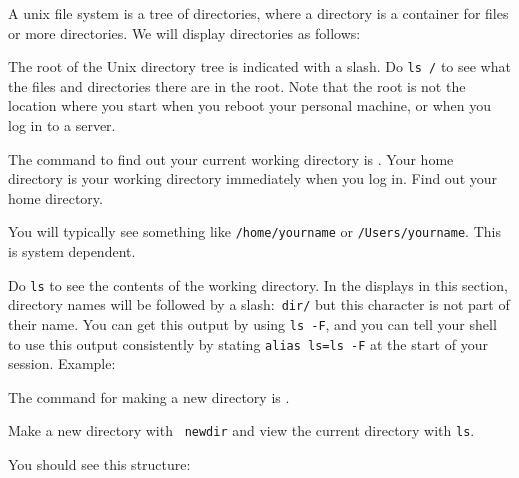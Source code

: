 A unix file system is a tree of directories, where a directory is a
container for files or more directories. We will display directories
as follows:

The root of the Unix directory tree is indicated with a slash. Do
\lstinline{ls /} to see what the files and directories there are in the
root. Note that the root is not the location where you start when you
reboot your personal machine, or when you log in to a server.

\begin{exercise}
  The command to find out your current working directory is
  . Your home directory is your working directory
  immediately when you log in. Find out your home directory.
\end{exercise}
\begin{outcome}
  You will typically see something like \lstinline{/home/yourname} or
  \lstinline{/Users/yourname}. This is system dependent.
\end{outcome}

Do \lstinline{ls} to see the contents of the working directory. In the
displays in this section, directory names will be followed by a
slash:~\lstinline{dir/} but this character is not part of their name.  You can
get this output by using \lstinline{ls -F}, and you can tell your shell to
use this output consistently by stating \lstinline{alias ls=ls -F} at the start of your
session. Example:


The command for making a new directory is .

\begin{exercise}
  Make a new directory with ~\lstinline{newdir} and view
  the current directory with \lstinline{ls}.
\end{exercise}
\begin{outcome}
  You should see this structure:
\end{outcome}

